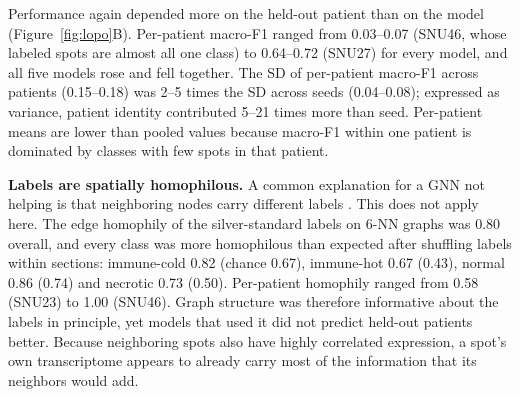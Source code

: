 \documentclass[11pt,letterpaper]{article}
\begin{document}
Performance again depended more on the held-out patient than on the model (Figure~\ref{fig:lopo}B). Per-patient macro-F1 ranged from 0.03--0.07 (SNU46, whose labeled spots are almost all one class) to 0.64--0.72 (SNU27) for every model, and all five models rose and fell together. The SD of per-patient macro-F1 across patients (0.15--0.18) was 2--5 times the SD across seeds (0.04--0.08); expressed as variance, patient identity contributed 5--21 times more than seed. Per-patient means are lower than pooled values because macro-F1 within one patient is dominated by classes with few spots in that patient.

\textbf{Labels are spatially homophilous.} A common explanation for a GNN not helping is that neighboring nodes carry different labels \cite{zhu2020homophily}. This does not apply here. The edge homophily of the silver-standard labels on 6-NN graphs was 0.80 overall, and every class was more homophilous than expected after shuffling labels within sections: immune-cold 0.82 (chance 0.67), immune-hot 0.67 (0.43), normal 0.86 (0.74) and necrotic 0.73 (0.50). Per-patient homophily ranged from 0.58 (SNU23) to 1.00 (SNU46). Graph structure was therefore informative about the labels in principle, yet models that used it did not predict held-out patients better. Because neighboring spots also have highly correlated expression, a spot's own transcriptome appears to already carry most of the information that its neighbors would add.
\end{document}
